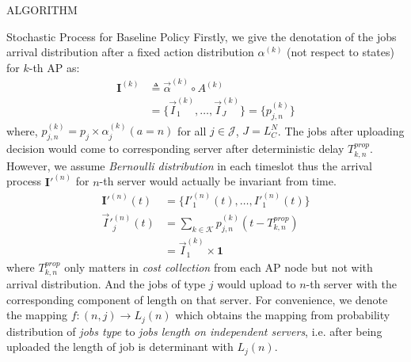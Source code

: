 \documentclass[10pt, conference, letterpaper]{IEEEtran}
\newcommand{\vecOne}{\mathbf{1}}
\begin{document}
\begin{section}{ALGORITHM}
\begin{subsection}{Stochastic Process for Baseline Policy}
            Firstly, we give the denotation of the jobs arrival distribution after a fixed action distribution $\alpha^{(k)}$ (not respect to states) for $k$-th AP as:
            \begin{align}
                \mathbf{I}^{(k)} &\triangleq \vec{\alpha}^{(k)} \circ A^{(k)}
                \nonumber\\
                &= \{ \vec{I}^{(k)}_{1}, \dots, \vec{I}^{(k)}_{J} \} = \{p^{(k)}_{j,n}\}
            \end{align}
            where, $p^{(k)}_{j,n} = p_j \times \alpha^{(k)}_j(a=n)$ for all $j \in \mathcal{J}$, $J=L_C^N$.
            The jobs after uploading decision would come to corresponding server after deterministic delay $T^{prop}_{k,n}$. However, we assume \emph{Bernoulli distribution} in each timeslot thus the arrival process $\mathbf{I}'^{(n)}$ for $n$-th server would actually be invariant from time.
            \begin{align}
                \mathbf{I}'^{(n)}(t) & = \{I'^{(n)}_1(t), \dots, I'^{(n)}_1(t) \}
                \\
                \vec{I}'^{(n)}_j(t) & = \sum_{k \in \mathcal{K}} p^{(k)}_{j,n}(t - T^{prop}_{k,n})
                \nonumber\\
                & = \vec{I}^{(k)}_{1} \times \vecOne
            \end{align}
            where $T^{prop}_{k,n}$ only matters in \emph{cost collection} from each AP node but not with arrival distribution. And the jobs of type $j$ would upload to $n$-th server with the corresponding component of length on that server. For convenience, we denote the mapping $f: (n,j) \to L_j(n)$ which obtains the mapping from probability distribution of \emph{jobs type} to \emph{jobs length on independent servers}, i.e. after being uploaded the length of job is determinant with $L_j(n)$.


\end{subsection}
\end{section}
\end{document}
